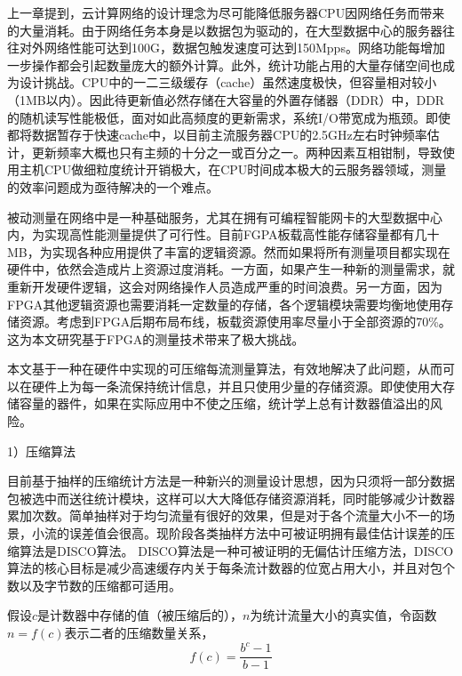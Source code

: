 上一章提到，云计算网络的设计理念为尽可能降低服务器CPU因网络任务而带来的大量消耗。由于网络任务本身是以数据包为驱动的，在大型数据中心的服务器往往对外网络性能可达到100G，数据包触发速度可达到150Mpps。网络功能每增加一步操作都会引起数量庞大的额外计算。此外，统计功能占用的大量存储空间也成为设计挑战。CPU中的一二三级缓存（cache）虽然速度极快，但容量相对较小（1MB以内）。因此待更新值必然存储在大容量的外置存储器（DDR）中，DDR的随机读写性能极低，面对如此高频度的更新需求，系统I/O带宽成为瓶颈。即使都将数据暂存于快速cache中，以目前主流服务器CPU的2.5GHz左右时钟频率估计，更新频率大概也只有主频的十分之一或百分之一。两种因素互相钳制，导致使用主机CPU做细粒度统计开销极大，在CPU时间成本极大的云服务器领域，测量的效率问题成为亟待解决的一个难点。

\label{chap352}

被动测量在网络中是一种基础服务，尤其在拥有可编程智能网卡的大型数据中心内，为实现高性能测量提供了可行性。目前FGPA板载高性能存储容量都有几十MB，为实现各种应用提供了丰富的逻辑资源。然而如果将所有测量项目都实现在硬件中，依然会造成片上资源过度消耗。一方面，如果产生一种新的测量需求，就重新开发硬件逻辑，这会对网络操作人员造成严重的时间浪费。另一方面，因为FPGA其他逻辑资源也需要消耗一定数量的存储，各个逻辑模块需要均衡地使用存储资源。考虑到FPGA后期布局布线，板载资源使用率尽量小于全部资源的70\%。这为本文研究基于FPGA的测量技术带来了极大挑战。

本文基于一种在硬件中实现的可压缩每流测量算法，有效地解决了此问题，从而可以在硬件上为每一条流保持统计信息，并且只使用少量的存储资源。即使使用大存储容量的器件，如果在实际应用中不使之压缩，统计学上总有计数器值溢出的风险。

\label{chap353}

1）压缩算法

目前基于抽样的压缩统计方法是一种新兴的测量设计思想，因为只须将一部分数据包被选中而送往统计模块，这样可以大大降低存储资源消耗，同时能够减少计数器累加次数。简单抽样对于均匀流量有很好的效果，但是对于各个流量大小不一的场景，小流的误差值会很高。现阶段各类抽样方法中可被证明拥有最佳估计误差的压缩算法是DISCO算法。
DISCO算法是一种可被证明的无偏估计压缩方法，DISCO算法的核心目标是减少高速缓存内关于每条流计数器的位宽占用大小，并且对包个数以及字节数的压缩都可适用。

假设$ c $是计数器中存储的值（被压缩后的），$ n $为统计流量大小的真实值，令函数$ n=f(c) $表示二者的压缩数量关系，
\begin{equation} \label{discofunc}
f(c)=\frac{b^c-1}{b-1}
\end{equation}

